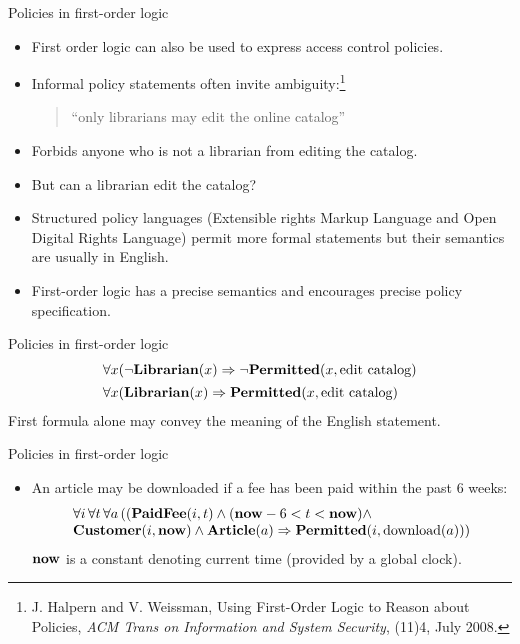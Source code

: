 \documentclass[style=sailor,size=12pt]{powerdot}
\begin{document}
\begin{wideslide}[bm=,toc=]{Policies in first-order logic}
\begin{itemize}
\item First order logic can also be used to express access control policies.
\item Informal policy statements often invite ambiguity:\footnote{
J. Halpern and V. Weissman, 
Using First-Order Logic to Reason about Policies, {\em ACM Trans on Information and System Security\/},
(11)4, July 2008.}
\begin{quote}
``only librarians may edit the online catalog''
\end{quote}
\item Forbids anyone who is not a librarian from editing the catalog.
\item But can a librarian edit the catalog?
\item Structured policy languages (Extensible rights Markup Language and Open Digital Rights Language)
permit more formal statements but their semantics are usually in English.
\item First-order logic has a precise semantics and encourages precise policy specification.
\end{itemize}
\end{wideslide}

\begin{wideslide}[bm=,toc=]{Policies in first-order logic}
\begin{displaymath}
\begin{array}{l}
\forall x(\neg\mbox{\bf Librarian}(x)\Rightarrow \neg\mbox{\bf Permitted}(x,\mbox{\rm edit catalog}) \\[1ex]
\forall x(\mbox{\bf Librarian}(x)\Rightarrow \mbox{\bf Permitted}(x,\mbox{\rm edit catalog})
\end{array}
\end{displaymath}
First formula alone may convey the meaning of the English statement.
\end{wideslide}

\begin{wideslide}[bm=,toc=]{Policies in first-order logic}
\begin{itemize}
\item An article may be downloaded if a fee has been paid within the past 6 weeks:
\begin{displaymath}
\begin{array}{l}
\forall i\, \forall t\, \forall a\, ((\mbox{\bf PaidFee}(i,t)\wedge (\mbox{\bf now} - 6 < t < \mbox{\bf now})\wedge \\
\mbox{\bf Customer}(i,\mbox{\bf now})\wedge\mbox{\bf Article}(a) \Rightarrow \mbox{\bf Permitted}(i,\mbox{\rm download}(a)))
\end{array}
\end{displaymath}
$\mbox{\bf now}$ is a constant denoting current time (provided by a global clock).
\end{itemize}
\end{wideslide}
\end{document}
